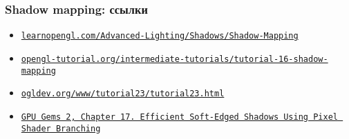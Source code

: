 \documentclass[10pt]{beamer}
\begin{document}
\begin{frame}[fragile]
\frametitle{Shadow mapping: ссылки}
\begin{itemize}
\item \href{https://learnopengl.com/Advanced-Lighting/Shadows/Shadow-Mapping}{\nolinkurl{learnopengl.com/Advanced-Lighting/Shadows/Shadow-Mapping}}
\item \href{http://www.opengl-tutorial.org/intermediate-tutorials/tutorial-16-shadow-mapping}{\nolinkurl{opengl-tutorial.org/intermediate-tutorials/tutorial-16-shadow-mapping}}
\item \href{https://ogldev.org/www/tutorial23/tutorial23.html}{\nolinkurl{ogldev.org/www/tutorial23/tutorial23.html}}
\item \href{https://developer.nvidia.com/gpugems/gpugems2/part-ii-shading-lighting-and-shadows/chapter-17-efficient-soft-edged-shadows-using}{\texttt{GPU Gems 2, Chapter 17. Efficient Soft-Edged Shadows Using Pixel Shader Branching}}
\end{itemize}
\end{frame}
\end{document}
